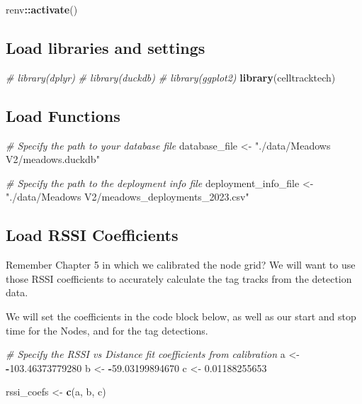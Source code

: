 \documentclass[
]{book}
\newenvironment{Shaded}{\begin{snugshade}}{\end{snugshade}}
\newcommand{\CommentTok}[1]{\textcolor[rgb]{0.56,0.35,0.01}{\textit{#1}}}
\newcommand{\FloatTok}[1]{\textcolor[rgb]{0.00,0.00,0.81}{#1}}
\newcommand{\FunctionTok}[1]{\textcolor[rgb]{0.13,0.29,0.53}{\textbf{#1}}}
\newcommand{\NormalTok}[1]{#1}
\newcommand{\OtherTok}[1]{\textcolor[rgb]{0.56,0.35,0.01}{#1}}
\newcommand{\SpecialCharTok}[1]{\textcolor[rgb]{0.81,0.36,0.00}{\textbf{#1}}}
\newcommand{\StringTok}[1]{\textcolor[rgb]{0.31,0.60,0.02}{#1}}
\begin{document}
\begin{Shaded}
\begin{Highlighting}[]
\NormalTok{renv}\SpecialCharTok{::}\FunctionTok{activate}\NormalTok{()}
\end{Highlighting}
\end{Shaded}

\subsection{Load libraries and settings}\label{load-libraries-and-settings-1}

\begin{Shaded}
\begin{Highlighting}[]
\CommentTok{\# library(dplyr)}
\CommentTok{\# library(duckdb)}
\CommentTok{\# library(ggplot2)}
\FunctionTok{library}\NormalTok{(celltracktech)}
\end{Highlighting}
\end{Shaded}

\subsection{Load Functions}\label{load-functions}

\begin{Shaded}
\begin{Highlighting}[]
\CommentTok{\# Specify the path to your database file}
\NormalTok{database\_file }\OtherTok{\textless{}{-}} \StringTok{"./data/Meadows V2/meadows.duckdb"}

\CommentTok{\# Specify the path to the deployment info file}
\NormalTok{deployment\_info\_file }\OtherTok{\textless{}{-}} \StringTok{"./data/Meadows V2/meadows\_deployments\_2023.csv"}
\end{Highlighting}
\end{Shaded}

\subsection{Load RSSI Coefficients}\label{load-rssi-coefficients}

Remember Chapter 5 in which we calibrated the node grid? We will want to use those RSSI coefficients to accurately calculate the tag tracks from the detection data.

We will set the coefficients in the code block below, as well as our start and stop time for the Nodes, and for the tag detections.

\begin{Shaded}
\begin{Highlighting}[]
\CommentTok{\# Specify the RSSI vs Distance fit coefficients from calibration}
\NormalTok{a }\OtherTok{\textless{}{-}} \SpecialCharTok{{-}}\FloatTok{103.46373779280}
\NormalTok{b }\OtherTok{\textless{}{-}} \SpecialCharTok{{-}}\FloatTok{59.03199894670}
\NormalTok{c }\OtherTok{\textless{}{-}} \FloatTok{0.01188255653}

\NormalTok{rssi\_coefs }\OtherTok{\textless{}{-}} \FunctionTok{c}\NormalTok{(a, b, c)}
\end{Highlighting}
\end{Shaded}
\end{document}
